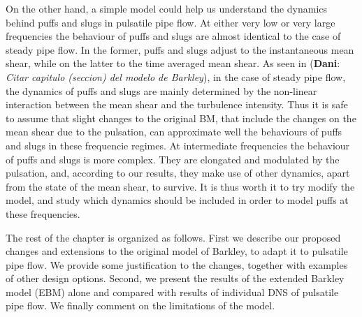 \documentclass{article}
\DeclareRobustCommand{\dm}[1]{{\color{blue}(\textbf{Dani}: \textit{#1}\xspace)}}
\begin{document}
On the other hand, a simple model could help us understand the dynamics behind puffs and slugs in pulsatile pipe flow. At either very low or very large frequencies the behaviour of puffs and slugs are almost identical to the case of steady pipe flow. In the former, puffs and slugs adjust to the instantaneous mean shear, while on the latter to the time averaged mean shear. As seen in \dm{Citar capitulo (seccion) del modelo de Barkley}, in the case of steady pipe flow, the dynamics of puffs and slugs are mainly determined by the non-linear interaction between the mean shear and the turbulence intensity. Thus it is safe to assume that slight changes to the original BM, that include the changes on the mean shear due to the pulsation, can approximate well the behaviours of puffs and slugs in these frequencie regimes. At intermediate frequencies the behaviour of puffs and slugs is more complex. They are elongated and modulated by the pulsation, and, according to our results, they make use of other dynamics, apart from the state of the mean shear, to survive. It is thus worth it to try modify the model, and study which dynamics should be included in order to model puffs at these frequencies. 

The rest of the chapter is organized as follows. First we describe our proposed changes and extensions to the original model of Barkley, to adapt it to pulsatile pipe flow. We provide some justification to the changes, together with examples of other design options. Second, we present the results of the extended Barkley model (EBM) alone and compared with results of individual DNS of pulsatile pipe flow. We finally comment on the limitations of the model. 



\end{document}

